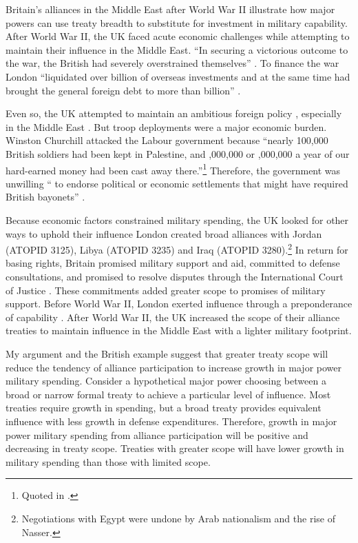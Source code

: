 \documentclass[12pt]{article}
\begin{document}
Britain's alliances in the Middle East after World War II illustrate how major powers can use treaty breadth to substitute for investment in military capability. 
After World War II, the UK faced acute economic challenges while attempting to maintain their influence in the Middle East. 
``In securing a victorious outcome to the war, the British had severely overstrained themselves'' \citep[pg. 367]{Kennedy1987}. 
To finance the war London ``liquidated over  billion of overseas investments and at the same time had brought the general foreign debt to more than  billion'' \citep[pg. 12]{Louis1984}.
 

Even so, the UK attempted to maintain an ambitious foreign policy \citep{Mayhew1950}, especially in the Middle East \citep{Rahman1982}. 
But troop deployments were a major economic burden. 
Winston Churchill attacked the Labour government because ``nearly 100,000 British soldiers had been kept in Palestine, and ,000,000 or ,000,000 a year of our hard-earned money had been cast away there.''\footnote{Quoted in \citet[pg. 11]{Louis1984}.}
Therefore, the government was unwilling `` to endorse political or economic settlements that might have required British bayonets'' \citep[pg. 15]{Louis1984}. 


Because economic factors constrained military spending, the UK looked for other ways to uphold their influence \citep{Monroe1963, Louis1984}
London created broad alliances with Jordan (ATOPID 3125), Libya (ATOPID 3235) and Iraq (ATOPID 3280).\footnote{Negotiations with Egypt were undone by Arab nationalism and the rise of Nasser.} 
In return for basing rights, Britain promised military support and aid, committed to defense consultations, and promised to resolve disputes through the International Court of Justice \citep{Leedsetal2002}. 
These commitments added greater scope to promises of military support. 
Before World War II, London exerted influence through a preponderance of capability \citep{Monroe1963}.
After World War II, the UK increased the scope of their alliance treaties to maintain influence in the Middle East with a lighter military footprint. 


My argument and the British example suggest that greater treaty scope will reduce the tendency of alliance participation to increase growth in major power military spending.
Consider a hypothetical major power choosing between a broad or narrow formal treaty to achieve a particular level of influence.  
Most treaties require growth in spending, but a broad treaty provides equivalent influence with less growth in defense expenditures. Therefore, growth in major power military spending from alliance participation will be positive and decreasing in treaty scope. 
Treaties with greater scope will have lower growth in military spending than those with limited scope. 
\end{document}
